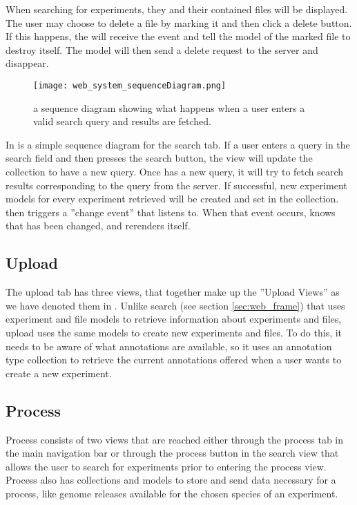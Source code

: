 \begin{example}
When searching for experiments, they and their contained files will be displayed. The user may choose to delete a file by marking it and then click a delete button. If this happens, the  will receive the event and tell the model of the marked file to destroy itself. The model will then send a delete request to the server and disappear.
\end{example}

 
\begin{figure}[h]
\centering
\texttt{[image: web\_system\_sequenceDiagram.png]}
\caption{\label{fig:web_system_sequenceDiagram} \footnotesize a sequence diagram showing what happens when a user enters a valid search query and results are fetched.}
\end{figure}

In  is a simple sequence diagram for the search tab. If a user enters a query in the search field and then presses the search button, the  view will update the  collection to have a new query. Once  has a new query, it will try to fetch search results corresponding to the query from the server. If successful, new experiment models for every experiment retrieved will be created and set in the  collection.  then triggers a ''change event'' that  listens to. When that event occurs,  knows that  has been changed, and rerenders itself.

\subsection{Upload}
The upload tab has three views, that together make up the ''Upload Views'' as we have denoted them in . Unlike search (see section \ref{sec:web_frame}) that uses experiment and file models to retrieve information about experiments and files, upload uses the same models to create new experiments and files. To do this, it needs to be aware of what annotations are available, so it uses an annotation type collection to retrieve the current annotations offered when a user wants to create a new experiment.

\subsection{Process} 
Process consists of two views that are reached either through the process
tab in the main navigation bar or through the process button in the search view
that allows the user to search for experiments prior to entering the process
view. Process also has collections and models to store and send data necessary 
for a process, like genome releases available for the chosen species of an 
experiment.

